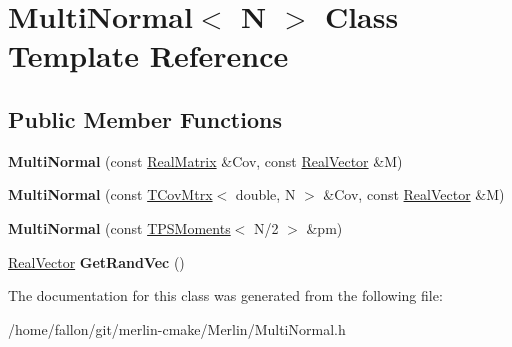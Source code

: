 \hypertarget{classMultiNormal}{}\section{Multi\+Normal$<$ N $>$ Class Template Reference}
\label{classMultiNormal}
\subsection*{Public Member Functions}
\begin{DoxyCompactItemize}
\item 
\mbox{\label{classMultiNormal_a3b51d29b8b3212b172be0c72392661af}} 
{\bfseries Multi\+Normal} (const \hyperlink{classTLAS_1_1Matrix}{Real\+Matrix} \&Cov, const \hyperlink{classTLAS_1_1Vector}{Real\+Vector} \&M)
\item 
\mbox{\label{classMultiNormal_af48239d7db6ef780ef7a7ae08a0c14f4}} 
{\bfseries Multi\+Normal} (const \hyperlink{classTCovMtrx}{T\+Cov\+Mtrx}$<$ double, N $>$ \&Cov, const \hyperlink{classTLAS_1_1Vector}{Real\+Vector} \&M)
\item 
\mbox{\label{classMultiNormal_ac7e7334ab62e8d489d02df817df1b64f}} 
{\bfseries Multi\+Normal} (const \hyperlink{classTPSMoments}{T\+P\+S\+Moments}$<$ N/2 $>$ \&pm)
\item 
\mbox{\label{classMultiNormal_ac6ba5ec025064bdf7794049c6d6c1021}} 
\hyperlink{classTLAS_1_1Vector}{Real\+Vector} {\bfseries Get\+Rand\+Vec} ()
\end{DoxyCompactItemize}


The documentation for this class was generated from the following file\+:\begin{DoxyCompactItemize}
\item 
/home/fallon/git/merlin-\/cmake/\+Merlin/Multi\+Normal.\+h\end{DoxyCompactItemize}
